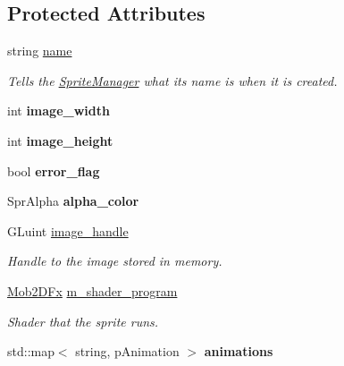 \subsection*{Protected Attributes}
\begin{DoxyCompactItemize}
\item 
\hypertarget{classSprite_a166409bbd17355e157618ec02441dab8}{
string \hyperlink{classSprite_a166409bbd17355e157618ec02441dab8}{name}}
\label{classSprite_a166409bbd17355e157618ec02441dab8}

\begin{DoxyCompactList}\small\item\em Tells the \hyperlink{classSpriteManager}{SpriteManager} what its name is when it is created. \item\end{DoxyCompactList}\item 
\hypertarget{classSprite_a61966212e1c8c4e49bffdff3b4e7325d}{
int {\bfseries image\_\-width}}
\label{classSprite_a61966212e1c8c4e49bffdff3b4e7325d}

\item 
\hypertarget{classSprite_a74f10073c5be4526a26d979f64123692}{
int {\bfseries image\_\-height}}
\label{classSprite_a74f10073c5be4526a26d979f64123692}

\item 
\hypertarget{classSprite_aee58d1a3893ec116bf0bb9090d3f62af}{
bool {\bfseries error\_\-flag}}
\label{classSprite_aee58d1a3893ec116bf0bb9090d3f62af}

\item 
\hypertarget{classSprite_a4a2a2209a899b95cbbacaebbb25f1f77}{
SprAlpha {\bfseries alpha\_\-color}}
\label{classSprite_a4a2a2209a899b95cbbacaebbb25f1f77}

\item 
\hypertarget{classSprite_aca94fcbf259307af0f7a8670f8ff7227}{
GLuint \hyperlink{classSprite_aca94fcbf259307af0f7a8670f8ff7227}{image\_\-handle}}
\label{classSprite_aca94fcbf259307af0f7a8670f8ff7227}

\begin{DoxyCompactList}\small\item\em Handle to the image stored in memory. \item\end{DoxyCompactList}\item 
\hypertarget{classSprite_a407a4d08962a8ddae1b865763be32d8e}{
\hyperlink{classMob2DFx}{Mob2DFx} \hyperlink{classSprite_a407a4d08962a8ddae1b865763be32d8e}{m\_\-shader\_\-program}}
\label{classSprite_a407a4d08962a8ddae1b865763be32d8e}

\begin{DoxyCompactList}\small\item\em Shader that the sprite runs. \item\end{DoxyCompactList}\item 
\hypertarget{classSprite_ab49f99655675110dc96aee742f03bc48}{
std::map$<$ string, pAnimation $>$ {\bfseries animations}}
\label{classSprite_ab49f99655675110dc96aee742f03bc48}

\end{DoxyCompactItemize}
